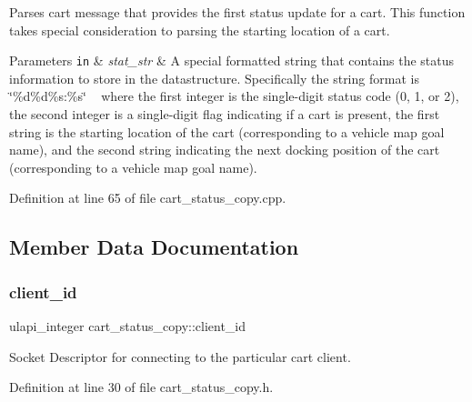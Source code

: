 Parses cart message that provides the first status update for a cart. This function takes special consideration to parsing the starting location of a cart. 
\begin{DoxyParams}[1]{Parameters}
\mbox{\tt in}  & {\em stat\+\_\+str} & A special formatted string that contains the status information to store in the datastructure. Specifically the string format is \char`\"{}\%d\%d\%s\+:\%s\char`\"{} ~\newline
 where the first integer is the single-\/digit status code (0, 1, or 2), the second integer is a single-\/digit flag indicating if a cart is present, the first string is the starting location of the cart (corresponding to a vehicle map goal name), and the second string indicating the next docking position of the cart (corresponding to a vehicle map goal name). \\
\hline
\end{DoxyParams}


Definition at line 65 of file cart\+\_\+status\+\_\+copy.\+cpp.



\subsection{Member Data Documentation}
\mbox{\label{classcart__status__copy_a8d8dca2a4a0c35f4676fc7d68254ca05}} 
\subsubsection{\texorpdfstring{client\+\_\+id}{client\_id}}
{\footnotesize\ttfamily ulapi\+\_\+integer cart\+\_\+status\+\_\+copy\+::client\+\_\+id\hspace{0.3cm}{\ttfamily [private]}}

Socket Descriptor for connecting to the particular cart client. 

Definition at line 30 of file cart\+\_\+status\+\_\+copy.\+h.

\mbox{\label{classcart__status__copy_a771289ffece9eb29e21a9deba5522888}} 
